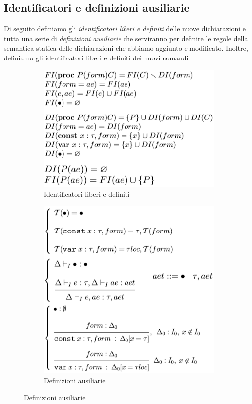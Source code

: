 \documentclass[a4paper,oneside,titlepage]{book}
\begin{document}
\subsection{Identificatori e definizioni ausiliarie}
Di seguito definiamo gli \textit{identificatori liberi e definiti} delle nuove dichiarazioni e tutta una serie di \textit{definizioni ausiliarie} che serviranno per definire le regole della semantica statica delle dichiarazioni che abbiamo aggiunto e modificato. Inoltre, definiamo gli identificatori liberi e definiti dei nuovi comandi.
\begin{figure}[htp]
	\begin{subfigure}{0.49\textwidth}
		\includegraphics[width=\textwidth, height=\textheight, keepaspectratio]{parFIDI.png} 
		\caption{Identificatori liberi e definiti}
	\end{subfigure}
	\hfill
	\begin{subfigure}{0.49\textwidth}
		\includegraphics[width=\textwidth, height=\textheight, keepaspectratio]{parAux.png}
		\caption{Definizioni ausiliarie}
	\end{subfigure}
\end{figure}
\end{document}
